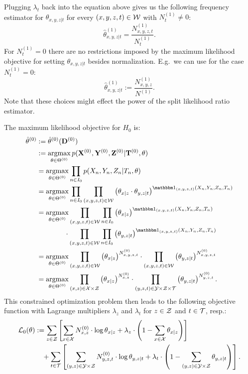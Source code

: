Plugging $\lambda_t$ back into the equation above gives us the following frequency estimator for $\theta_{x,y,z|t}$ 
for every $(x,y,z,t) \in \mathcal{W}$ with $N_{t}^{(1)} \neq 0$:
\[ \hat \theta_{x,y,z|t}^{(1)} = \frac{N_{x,y,z,t}^{(1)}}{N_{t}^{(1)}}.\]
For $N_{t}^{(1)} = 0$ there are no restrictions imposed by the maximum likelihood objective for setting $\theta_{x,y,z|t}$ besides normalization. 
E.g.\ we can use for the case $N_{t}^{(1)} = 0$:
\[ \hat \theta_{x,y,z|t}^{(1)} := \frac{N_{x,y,z}^{(1)}}{N^{(1)}}.\]
Note that these choices might effect the power of the split likelihood ratio estimator.

The maximum likelihood objective for $H_0$ is:
\begin{align*} \hat \theta^{(0)} &:= \hat \theta^{(0)}(\Dbf^{(0)}) \\
&:= \argmax_{\theta \in\Theta^{(0)}} p(\Xbf^{(0)},\Ybf^{(0)},\Zbf^{(0)}|\Tbf^{(0)},\theta) \\
&= \argmax_{\theta \in\Theta^{(0)}} \prod_{n \in I_0}  p(X_n,Y_n,Z_n|T_n,\theta) \\
&= \argmax_{\theta \in\Theta^{(0)}}  \prod_{n \in I_0}\prod_{(x,y,z,t)\in \Wcal} \lp \theta_{x|z} \cdot \theta_{y,z|t} \rp^{\I_{(x,y,z,t)}(X_n,Y_n,Z_n,T_n)} \\
&= \argmax_{\theta \in\Theta^{(0)}} \prod_{(x,y,z,t)\in \Wcal}\prod_{n \in I_0} \lp \theta_{x|z}  \rp^{\I_{(x,y,z,t)}(X_n,Y_n,Z_n,T_n)}\\ 
& \qquad \qquad \cdot \prod_{(x,y,z,t)\in \Wcal}\prod_{n \in I_0} \lp \theta_{y,z|t} \rp^{\I_{(x,y,z,t)}(X_n,Y_n,Z_n,T_n)} \\
&= \argmax_{\theta \in\Theta^{(0)}} \prod_{(x,y,z,t)\in \Wcal}\lp \theta_{x|z}  \rp^{N_{x,y,z,t}^{(0)}} \cdot \prod_{(x,y,z,t)\in \Wcal} \lp \theta_{y,z|t} \rp^{N_{x,y,z,t}^{(0)}} \\
&= \argmax_{\theta \in\Theta^{(0)}} \prod_{(x,z)\in \Xcal\times\Zcal}\lp \theta_{x|z}  \rp^{N_{x,z}^{(0)}} \cdot \prod_{(y,z,t)\in \Ycal\times\Zcal\times\Tcal} \lp \theta_{y,z|t} \rp^{N_{y,z,t}^{(0)}}.
\end{align*}
This constrained optimization problem then leads to the following objective function with Lagrange multipliers
$\lambda_z$ and $\lambda_t$ for $z \in \mathcal{Z}$ and $t \in \mathcal{T}$, resp.:
\begin{align*}
    \mathcal{L}_0(\theta) &:= \sum_{z\in \mathcal{Z}} \left [ \sum_{x \in \mathcal{X}}  N_{x,z}^{(0)} \cdot \log  \theta_{x|z}   
    + \lambda_z \cdot \left ( 1- \sum_{x \in \mathcal{X}} \theta_{x|z} \right )\right ] \\ 
      &\quad   + \sum_{t\in \mathcal{T}} \left [ \sum_{(y,z)\in \mathcal{Y}\times\mathcal{Z}}   N_{y,z,t}^{(0)} \cdot \log \theta_{y,z|t} 
      + \lambda_t \cdot \left ( 1 - \sum_{(y,z) \in \mathcal{Y}\times\mathcal{Z}} \theta_{y,z|t}  \right ) \right ].
\end{align*}
